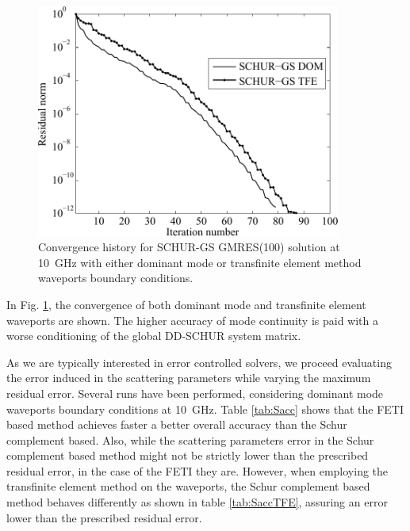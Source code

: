 \begin{figure}[h!]
\centering
\includegraphics[width=10cm]{schurdomtfe}
\caption{Convergence history for SCHUR-GS GMRES(100) solution at 10~GHz with either dominant mode or transfinite element method waveports boundary conditions.}
\label{fig:schurdomtfe}
\end{figure}

In Fig. \ref{fig:schurdomtfe}, the convergence of both dominant mode and transfinite element waveports are shown. The higher accuracy of mode continuity is paid with a worse conditioning of the global DD-SCHUR system matrix.

As we are typically interested in error controlled solvers, we proceed evaluating the error induced in the scattering parameters while varying the maximum residual error. Several runs have been performed, considering dominant mode waveports boundary conditions at 10~GHz. Table \ref{tab:Sacc} shows that the FETI based method achieves faster a better overall accuracy than the Schur complement based. Also, while the scattering parameters error in the Schur complement based method might not be strictly lower than the prescribed residual error, in the case of the FETI they are.
However, when employing the transfinite element method on the waveports, the Schur complement based method behaves differently as shown in table \ref{tab:SaccTFE}, assuring an error lower than the prescribed residual error. 

